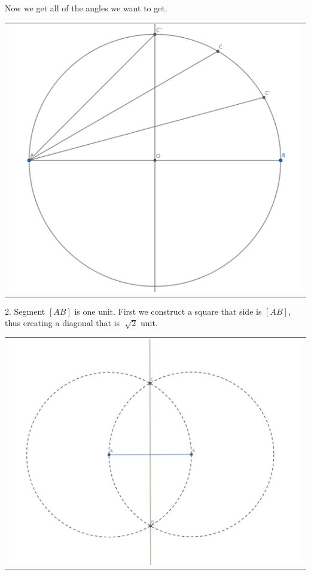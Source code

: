 \documentclass[letter,12pt]{article}
\begin{document}
Now we get all of the angles we want to get.
\begin{center}
	\begin{tabular}{c}
		\includegraphics[width=0.7\columnwidth]{Q1A_5.png} \\
	\end{tabular}
\end{center}


2. 
Segment $[AB]$ is one unit. First we construct a square that side is $[AB]$, thus creating a diagonal that is $\sqrt[]{2}$ unit.
\begin{center}
	\begin{tabular}{c}
		\includegraphics[width=0.7\columnwidth]{Q1B_1.png} \\
	\end{tabular}
\end{center}
\end{document}

